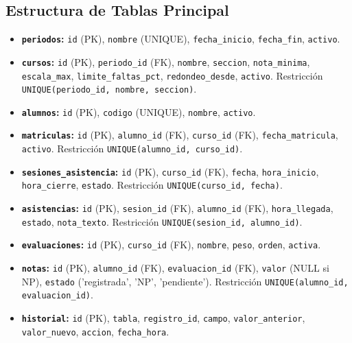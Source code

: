 \documentclass[12pt,a4paper]{article}
\begin{document}
\subsection{Estructura de Tablas Principal}
\begin{itemize}
    \item \textbf{\texttt{periodos}:} \texttt{id} (PK), \texttt{nombre} (UNIQUE), \texttt{fecha\_inicio}, \texttt{fecha\_fin}, \texttt{activo}.
    \item \textbf{\texttt{cursos}:} \texttt{id} (PK), \texttt{periodo\_id} (FK), \texttt{nombre}, \texttt{seccion}, \texttt{nota\_minima}, \texttt{escala\_max}, \texttt{limite\_faltas\_pct}, \texttt{redondeo\_desde}, \texttt{activo}. Restricción \texttt{UNIQUE(periodo\_id, nombre, seccion)}.
    \item \textbf{\texttt{alumnos}:} \texttt{id} (PK), \texttt{codigo} (UNIQUE), \texttt{nombre}, \texttt{activo}.
    \item \textbf{\texttt{matriculas}:} \texttt{id} (PK), \texttt{alumno\_id} (FK), \texttt{curso\_id} (FK), \texttt{fecha\_matricula}, \texttt{activo}. Restricción \texttt{UNIQUE(alumno\_id, curso\_id)}.
    \item \textbf{\texttt{sesiones\_asistencia}:} \texttt{id} (PK), \texttt{curso\_id} (FK), \texttt{fecha}, \texttt{hora\_inicio}, \texttt{hora\_cierre}, \texttt{estado}. Restricción \texttt{UNIQUE(curso\_id, fecha)}.
    \item \textbf{\texttt{asistencias}:} \texttt{id} (PK), \texttt{sesion\_id} (FK), \texttt{alumno\_id} (FK), \texttt{hora\_llegada}, \texttt{estado}, \texttt{nota\_texto}. Restricción \texttt{UNIQUE(sesion\_id, alumno\_id)}.
    \item \textbf{\texttt{evaluaciones}:} \texttt{id} (PK), \texttt{curso\_id} (FK), \texttt{nombre}, \texttt{peso}, \texttt{orden}, \texttt{activa}.
    \item \textbf{\texttt{notas}:} \texttt{id} (PK), \texttt{alumno\_id} (FK), \texttt{evaluacion\_id} (FK), \texttt{valor} (NULL si NP), \texttt{estado} ('registrada', 'NP', 'pendiente'). Restricción \texttt{UNIQUE(alumno\_id, evaluacion\_id)}.
    \item \textbf{\texttt{historial}:} \texttt{id} (PK), \texttt{tabla}, \texttt{registro\_id}, \texttt{campo}, \texttt{valor\_anterior}, \texttt{valor\_nuevo}, \texttt{accion}, \texttt{fecha\_hora}.
\end{itemize}

\end{document}
